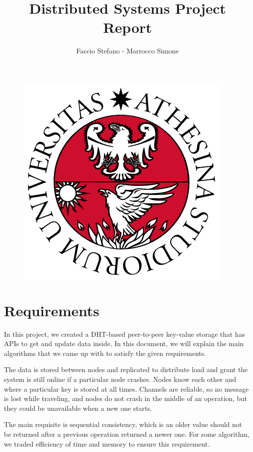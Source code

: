 \documentclass[12pt, a4paper]{article}
\title{Distributed Systems Project Report}
\author{Faccio Stefano - Marrocco Simone}
\begin{document}
    \maketitle
    \begin{figure}[H]
        \centering
        \includegraphics[scale=0.35]{unitn.png}
    \end{figure}

    \pagebreak
    \tableofcontents

    \section{Requirements}
    In this project, we created a DHT-based peer-to-peer key-value storage that has APIs to get and update data inside. In this document, we will explain the main algorithms that we came up with to satisfy the given requirements. 

    The data is stored between nodes and replicated to distribute load and grant the system is still online if a particular node crashes. Nodes know each other and where a particular key is stored at all times. Channels are reliable, so no message is lost while traveling, and nodes do not crash in the middle of an operation, but they could be unavailable when a new one starts.

    The main requisite is sequential consistency, which is an older value should not be returned after a previous operation returned a newer one. For some algorithm, we traded efficiency of time and memory to ensure this requirement.
\end{document}
